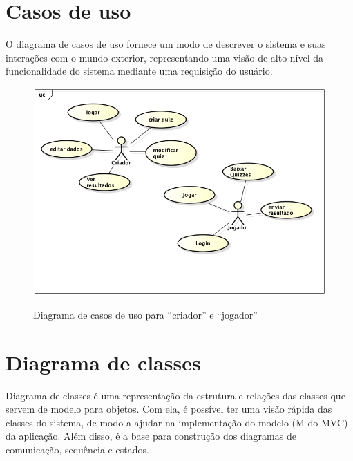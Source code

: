 \section{Casos de uso}
O diagrama de casos de uso fornece um modo de descrever o sistema e suas interações com o mundo exterior, representando uma visão de alto nível da funcionalidade do sistema mediante uma requisição do usuário.
 
\begin{figure}[H]
  \centering
  \includegraphics[scale =0.6]{figs/casos_de_uso.png}\\
  \caption{ Diagrama de casos de uso para ``criador'' e ``jogador'' }
  \label{FIG:Form_Factor}
\end{figure} 
 
 
\section{Diagrama de classes}\label{SEC:MER}
 
	Diagrama de classes é uma representação da estrutura e relações das classes que servem de modelo para objetos. Com ela, é possível ter uma visão rápida das classes do sistema, de modo a ajudar na implementação do modelo (M do \ac{MVC}) da aplicação. Além disso, é a base para construção dos diagramas de comunicação, sequência e estados.


